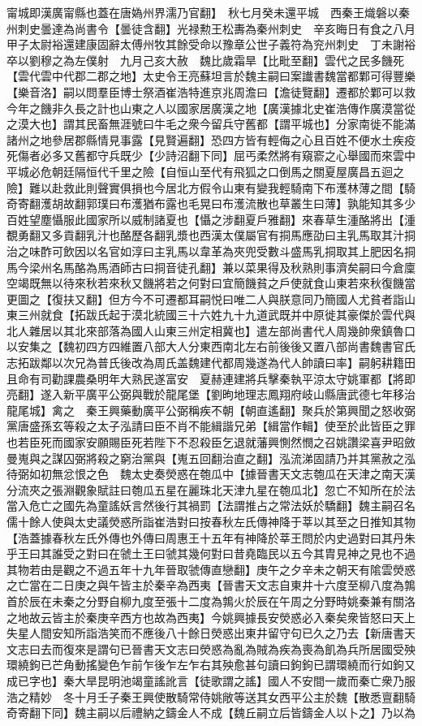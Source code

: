 甯城即漢廣甯縣也蓋在唐媯州界濡乃官翻】　秋七月癸未還平城　西秦王熾磐以秦州刺史曇達為尚書令【曇徒含翻】光禄勲王松夀為秦州刺史　辛亥晦日有食之八月甲子太尉裕還建康固辭太傅州牧其餘受命以豫章公世子義符為兖州刺史　丁未謝裕卒以劉穆之為左僕射　九月己亥大赦　魏比歲霜旱【比毗至翻】雲代之民多饑死【雲代雲中代郡二郡之地】太史令王亮蘇坦言於魏主嗣曰案䜟書魏當都鄴可得豐樂【樂音洛】嗣以問羣臣博士祭酒崔浩特進京兆周澹曰【澹徒覽翻】遷都於鄴可以救今年之饑非久長之計也山東之人以國家居廣漢之地【廣漢據北史崔浩傳作廣漠當從之漠大也】謂其民畜無涯號曰牛毛之衆今留兵守舊都【謂平城也】分家南徙不能滿諸州之地參居郡縣情見事露【見賢遍翻】恐四方皆有輕侮之心且百姓不便水土疾疫死傷者必多又舊都守兵既少【少詩沼翻下同】屈丐柔然將有窺窬之心舉國而來雲中平城必危朝廷隔恒代千里之險【自恒山至代有飛狐之口倒馬之關夏屋廣昌五迴之險】難以赴救此則聲實俱損也今居北方假令山東有變我輕騎南下布濩林薄之間【騎奇寄翻濩胡故翻郭璞曰布濩猶布露也毛晃曰布濩流散也草叢生曰薄】孰能知其多少百姓望塵懾服此國家所以威制諸夏也【懾之涉翻夏戶雅翻】來春草生湩酪將出【湩覩勇翻又多貢翻乳汁也酪歷各翻乳漿也西漢太僕屬官有挏馬應劭曰主乳馬取其汁挏治之味酢可飲因以名官如淳曰主乳馬以韋革為夾兜受數斗盛馬乳挏取其上肥因名挏馬今梁州名馬酪為馬酒師古曰挏音徒孔翻】兼以菜果得及秋熟則事濟矣嗣曰今倉廩空竭既無以待來秋若來秋又饑將若之何對曰宜簡饑貧之戶使就食山東若來秋復饑當更圖之【復扶又翻】但方今不可遷都耳嗣悦曰唯二人與朕意同乃簡國人尤貧者詣山東三州就食【拓跋氏起于漠北統國三十六姓九十九道武既并中原徙其豪傑於雲代與北人雜居以其北來部落為國人山東三州定相冀也】遣左部尚書代人周幾帥衆鎮魯口以安集之【魏初四方四維置八部大人分東西南北左右前後後又置八部尚書魏書官氏志拓跋鄰以次兄為普氏後改為周氏盖魏建代都周幾遂為代人帥讀曰率】嗣躬耕籍田且命有司勸課農桑明年大熟民遂富安　夏赫連建將兵擊秦執平涼太守姚軍都【將即亮翻】遂入新平廣平公弼與戰於龍尾堡【劉昫地理志鳳翔府岐山縣唐武德七年移治龍尾城】禽之　秦王興藥動廣平公弼稱疾不朝【朝直遙翻】聚兵於第興聞之怒收弼黨唐盛孫玄等殺之太子泓請曰臣不肖不能緝諧兄弟【緝當作輯】使至於此皆臣之罪也若臣死而國家安願賜臣死若陛下不忍殺臣乞退就藩興惻然憫之召姚讚梁喜尹昭斂曼嵬與之謀囚弼將殺之窮治黨與【嵬五回翻治直之翻】泓流涕固請乃并其黨赦之泓待弼如初無忿恨之色　魏太史奏熒惑在匏瓜中【據晉書天文志匏瓜在天津之南天漢分流夾之張淵觀象賦註曰匏瓜五星在麗珠北天津九星在匏瓜北】忽亡不知所在於法當入危亡之國先為童謠妖言然後行其禍罰【法謂推占之常法妖於驕翻】魏主嗣召名儒十餘人使與太史議熒惑所詣崔浩對曰按春秋左氏傳神降于莘以其至之日推知其物【浩蓋據春秋左氏外傳也外傳曰周惠王十五年有神降於莘王問於内史過對曰其丹朱乎王曰其誰受之對曰在虢土王曰虢其幾何對曰昔堯臨民以五今其胄見神之見也不過其物若由是觀之不過五年十九年晉取虢傳直戀翻】庚午之夕辛未之朝天有隂雲熒惑之亡當在二日庚之與午皆主於秦辛為西夷【晉書天文志自東井十六度至柳八度為鶉首於辰在未秦之分野自柳九度至張十二度為鶉火於辰在午周之分野時姚秦兼有關洛之地故云皆主於秦庚辛西方也故為西夷】今姚興據長安熒惑必入秦矣衆皆怒曰天上失星人間安知所詣浩笑而不應後八十餘日熒惑出東井留守句已久之乃去【新唐書天文志曰去而復來是謂句已晉書天文志曰熒惑為亂為賊為疾為喪為飢為兵所居國受殃環繞鉤已芒角動搖變色乍前乍後乍左乍右其殃愈甚句讀曰鉤鉤已謂環繞而行如鉤又成已字也】秦大旱昆明池竭童謠訛言【徒歌謂之謠】國人不安間一歲而秦亡衆乃服浩之精妙　冬十月壬子秦王興使散騎常侍姚敞等送其女西平公主於魏【散悉亶翻騎奇寄翻下同】魏主嗣以后禮納之鑄金人不成【魏丘嗣立后皆鑄金人以卜之】乃以為